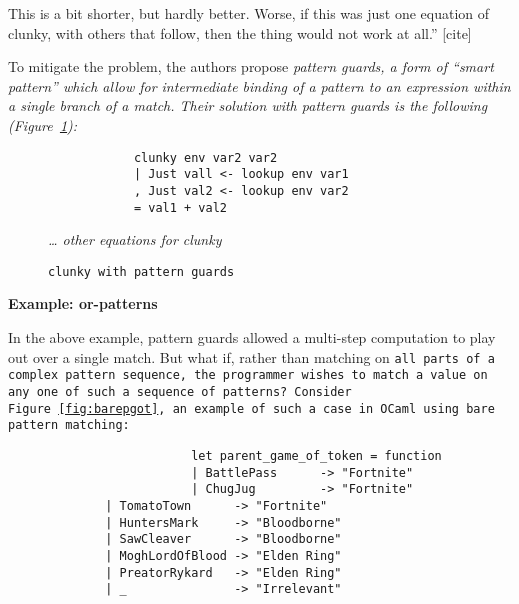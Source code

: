 \documentclass[manuscript,screen,review, 12pt]{acmart}
\begin{document}
\begin{outline}[enumerate]
        This is a bit shorter, but hardly better. Worse, if this was just one
        equation of clunky, with others that follow, then the thing would not
        work at all.” [cite]
        
        To mitigate the problem, the authors propose \it{pattern guards}, a form
        of “smart pattern” which allow for intermediate binding of a pattern to
        an expression within a single branch of a match. Their solution with
        pattern guards is the following (Figure~\ref{fig:guardclunky}): 

    \begin{figure}[hbt!]  
        \begin{center}
        \begin{verbatim}
            clunky env var2 var2    
            | Just vall <- lookup env var1
            , Just val2 <- lookup env var2
            = val1 + val2
        \end{verbatim}
        \it{… other equations for clunky}
        \end{center}    
    
    \caption{\tt{clunky} with pattern guards} 
    \label{fig:guardclunky}
    \end{figure}
        
        \2 \bf{Example: or-patterns}

        In the above example, pattern guards allowed a multi-step computation to
        play out over a single match. But what if, rather than matching on
        \tt{all} parts of a complex pattern sequence, the programmer wishes to
        match a value on \tt{any one} of such a sequence of patterns? Consider
        Figure~\ref{fig:barepgot}, an example of such a case in OCaml using bare
        pattern matching: 
       
        \begin{figure}
            \begin{center}
                \begin{verbatim}
                    let parent_game_of_token = function 
                    | BattlePass      -> "Fortnite"
                    | ChugJug         -> "Fortnite"
        | TomatoTown      -> "Fortnite"
        | HuntersMark     -> "Bloodborne"
        | SawCleaver      -> "Bloodborne"
        | MoghLordOfBlood -> "Elden Ring"
        | PreatorRykard   -> "Elden Ring"
        | _               -> "Irrelevant"
                \end{verbatim}
            \end{center}    


\end{figure}
\end{outline}
\end{document}
